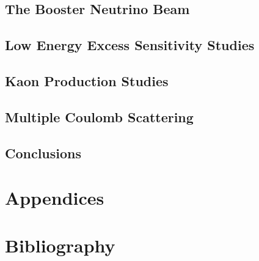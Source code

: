 \documentclass[11pt,openright,twoside,letterpaper,onecolumn]{report} %
\begin{document}
\chapter{The Booster Neutrino Beam}
\label{sec:beam}


\chapter{Low Energy Excess Sensitivity Studies}
\label{sec:LEEsensitivity}


\chapter{Kaon Production Studies}
\label{sec:kaon}


\chapter{Multiple Coulomb Scattering}
\label{sec:MCS}


\chapter{Conclusions}
\label{sec:conclusions}


\part{Appendices}
\appendix


\part{Bibliography}

 
\end{document}
